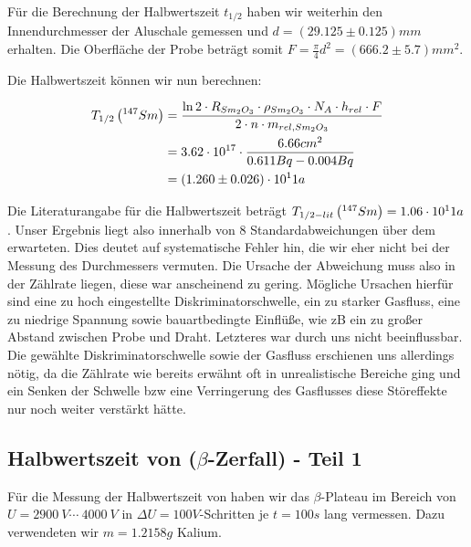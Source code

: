 Für die Berechnung der Halbwertszeit $t_{1/2}$ haben wir weiterhin den Innendurchmesser der Aluschale gemessen und $d = (29.125 \pm 0.125) mm$ erhalten. Die Oberfläche der Probe beträgt somit $F = \frac{\pi}{4} d^2 = (666.2 \pm 5.7) mm^2$.

Die Halbwertszeit können wir nun berechnen:

\begin{align}
 T_{1/2} \left( ^{147}_{}{Sm} \right) &= \frac{\ln 2 \cdot R_{Sm_2O_3} \cdot \rho_{Sm_2O_3} \cdot N_A \cdot h_{rel} \cdot F}{2 \cdot n \cdot m_{rel,Sm_2O_3}} \\
 & = 3.62\cdot 10^{17} \cdot \frac{6.66cm^2}{0.611 Bq - 0.004 Bq} \\
 & = (1.260 \pm 0.026) \cdot 10^11 a
\end{align}

Die Literaturangabe für die Halbwertszeit beträgt $T_{1/2 - lit} \left( ^{147}_{}{Sm} \right) = 1.06 \cdot 10^11 a$. Unser Ergebnis liegt also innerhalb von 8 Standardabweichungen über dem erwarteten. Dies deutet auf systematische Fehler hin, die wir eher nicht bei der Messung des Durchmessers vermuten. Die Ursache der Abweichung muss also in der Zählrate liegen, diese war anscheinend zu gering. Mögliche Ursachen hierfür sind eine zu hoch eingestellte Diskriminatorschwelle, ein zu starker Gasfluss, eine zu niedrige Spannung sowie bauartbedingte Einflüße, wie zB ein zu großer Abstand zwischen Probe und Draht. Letzteres war durch uns nicht beeinflussbar. Die gewählte Diskriminatorschwelle sowie der Gasfluss erschienen uns allerdings nötig, da die Zählrate wie bereits erwähnt oft in unrealistische Bereiche ging und ein Senken der Schwelle bzw eine Verringerung des Gasflusses diese Störeffekte nur noch weiter verstärkt hätte.  

\subsection{Halbwertszeit von  ($\beta$-Zerfall) - Teil 1}

Für die Messung der Halbwertszeit von  haben wir das $\beta$-Plateau im Bereich von $U = 2900\ V \cdots\ 4000\ V$ in $\Delta U = 100 V$-Schritten je $t=100s$ lang vermessen. Dazu verwendeten wir $m=1.2158g$ Kalium.

